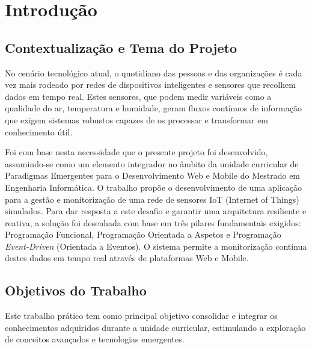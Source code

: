 \section{Introdução} \label{sec:introducao}

\subsection{Contextualização e Tema do Projeto}

No cenário tecnológico atual, o quotidiano das pessoas e das organizações é cada vez mais rodeado por redes de dispositivos inteligentes e sensores que recolhem dados em tempo real. Estes sensores, que podem medir variáveis como a qualidade do ar, temperatura e humidade, geram fluxos contínuos de informação que exigem sistemas robustos capazes de os processar e transformar em conhecimento útil. 

Foi com base nesta necessidade que o presente projeto foi desenvolvido, assumindo-se como um elemento integrador no âmbito da unidade curricular de Paradigmas Emergentes para o Desenvolvimento Web e Mobile do Mestrado em Engenharia Informática. O trabalho propõe o desenvolvimento de uma aplicação para a gestão e monitorização de uma rede de sensores IoT (Internet of Things) simulados. Para dar resposta a este desafio e garantir uma arquitetura resiliente e reativa, a solução foi desenhada com base em três pilares fundamentais exigidos: Programação Funcional, Programação Orientada a Aspetos e Programação \textit{Event-Driven} (Orientada a Eventos). O sistema permite a monitorização contínua destes dados em tempo real através de plataformas Web e Mobile.

\subsection{Objetivos do Trabalho}

Este trabalho prático tem como principal objetivo consolidar e integrar os conhecimentos adquiridos durante a unidade curricular, estimulando a exploração de conceitos avançados e tecnologias emergentes. 

